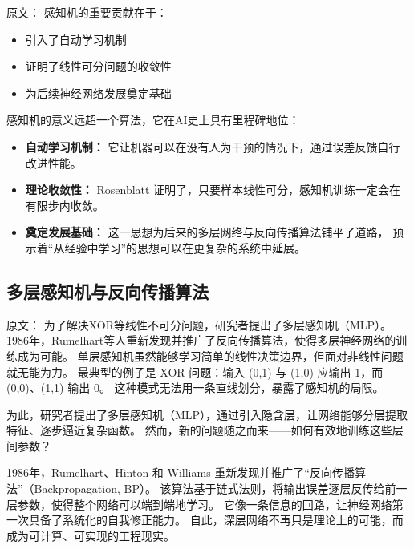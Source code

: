 原文：
感知机的重要贡献在于：
\begin{itemize}
\item 引入了自动学习机制
\item 证明了线性可分问题的收敛性
\item 为后续神经网络发展奠定基础
\end{itemize}
感知机的意义远超一个算法，它在AI史上具有里程碑地位：
\begin{itemize}
\item {\bf 自动学习机制：} 它让机器可以在没有人为干预的情况下，通过误差反馈自行改进性能。
\item {\bf 理论收敛性：} Rosenblatt 证明了，只要样本线性可分，感知机训练一定会在有限步内收敛。
\item {\bf 奠定发展基础：} 这一思想为后来的多层网络与反向传播算法铺平了道路，  
预示着“从经验中学习”的思想可以在更复杂的系统中延展。
\end{itemize}


\subsection{多层感知机与反向传播算法}

原文：
为了解决XOR等线性不可分问题，研究者提出了多层感知机（MLP）。1986年，Rumelhart等人重新发现并推广了反向传播算法，使得多层神经网络的训练成为可能。
单层感知机虽然能够学习简单的线性决策边界，但面对非线性问题就无能为力。  
最典型的例子是 XOR 问题：输入 (0,1) 与 (1,0) 应输出 1，而 (0,0)、(1,1) 输出 0。  
这种模式无法用一条直线划分，暴露了感知机的局限。  

为此，研究者提出了多层感知机（MLP），通过引入隐含层，让网络能够分层提取特征、逐步逼近复杂函数。  
然而，新的问题随之而来——如何有效地训练这些层间参数？  

1986年，Rumelhart、Hinton 和 Williams 重新发现并推广了“反向传播算法”（Backpropagation, BP）。  
该算法基于链式法则，将输出误差逐层反传给前一层参数，使得整个网络可以端到端地学习。  
它像一条信息的回路，让神经网络第一次具备了系统化的自我修正能力。  
自此，深层网络不再只是理论上的可能，而成为可计算、可实现的工程现实。

